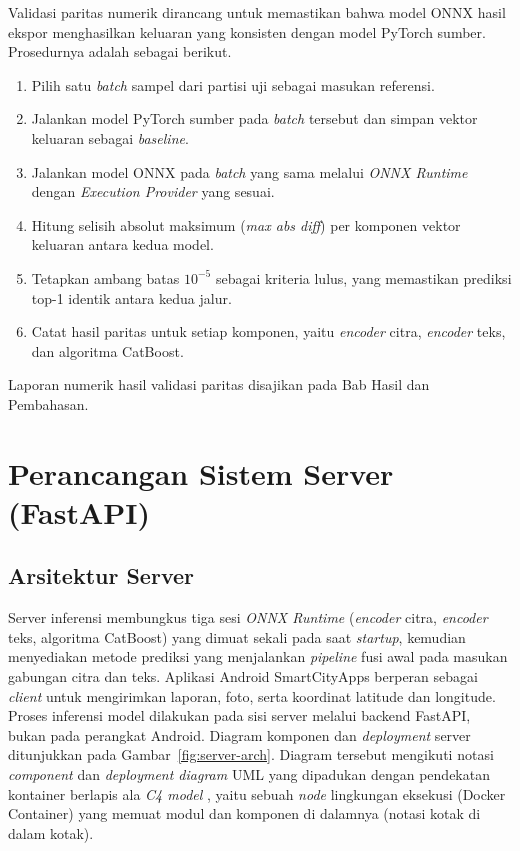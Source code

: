Validasi paritas numerik dirancang untuk memastikan bahwa model ONNX hasil ekspor menghasilkan keluaran yang konsisten dengan model PyTorch sumber. Prosedurnya adalah sebagai berikut.

\begin{enumerate}
    \item Pilih satu \textit{batch} sampel dari partisi uji sebagai masukan referensi.
    \item Jalankan model PyTorch sumber pada \textit{batch} tersebut dan simpan vektor keluaran sebagai \textit{baseline}.
    \item Jalankan model ONNX pada \textit{batch} yang sama melalui \textit{ONNX Runtime} dengan \textit{Execution Provider} yang sesuai.
    \item Hitung selisih absolut maksimum (\textit{max abs diff}) per komponen vektor keluaran antara kedua model.
    \item Tetapkan ambang batas $10^{-5}$ sebagai kriteria lulus, yang memastikan prediksi top-1 identik antara kedua jalur.
    \item Catat hasil paritas untuk setiap komponen, yaitu \textit{encoder} citra, \textit{encoder} teks, dan algoritma CatBoost.
\end{enumerate}

Laporan numerik hasil validasi paritas disajikan pada Bab Hasil dan Pembahasan.

\section{Perancangan Sistem Server (FastAPI)}
\label{sec:server-design}

\subsection{Arsitektur Server}

Server inferensi membungkus tiga sesi \textit{ONNX Runtime} (\textit{encoder} citra, \textit{encoder} teks, algoritma CatBoost) yang dimuat sekali pada saat \textit{startup}, kemudian menyediakan metode prediksi yang menjalankan \textit{pipeline} fusi awal pada masukan gabungan citra dan teks. Aplikasi Android SmartCityApps berperan sebagai \textit{client} untuk mengirimkan laporan, foto, serta koordinat latitude dan longitude. Proses inferensi model dilakukan pada sisi server melalui backend FastAPI, bukan pada perangkat Android. Diagram komponen dan \textit{deployment} server ditunjukkan pada Gambar~\ref{fig:server-arch}. Diagram tersebut mengikuti notasi \textit{component} dan \textit{deployment diagram} UML \citep{boochUML2005} yang dipadukan dengan pendekatan kontainer berlapis ala \textit{C4 model} \citep{brownC42018}, yaitu sebuah \textit{node} lingkungan eksekusi (Docker Container) yang memuat modul dan komponen di dalamnya (notasi kotak di dalam kotak).


